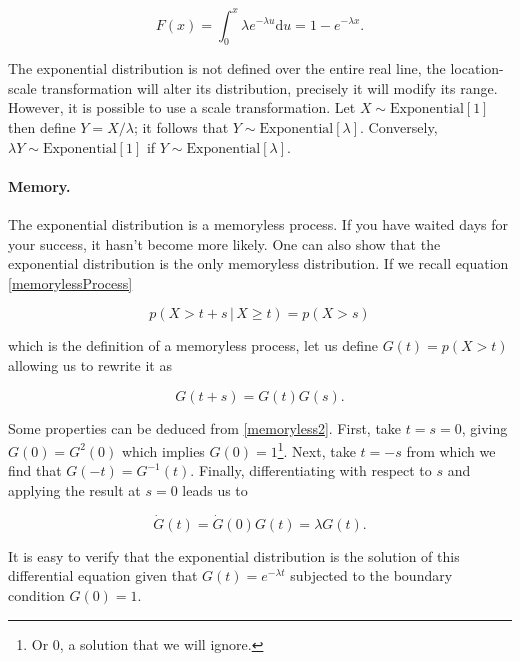 \documentclass[12pt]{article}
\begin{document}
\begin{equation}
F(x) = \int_{0}^{x} \lambda e^{- \lambda u} \mathrm{d} u =
1 - e^{-\lambda x}.
\end{equation}

\noindent
The exponential distribution is not defined over the entire
real line, the location-scale transformation will alter its distribution,
precisely it will modify its range.
However, it is possible to use a scale transformation.
Let $X \sim \text{Exponential} [1] $ then define 
$Y = X / \lambda$; it follows that $Y \sim \text{Exponential} [ \lambda ] $.
Conversely, $\lambda Y \sim \text{Exponential}[1]$ if $ Y \sim \text{Exponential} [ \lambda ]$.

\paragraph{Memory.}
The exponential distribution is a memoryless process.
If you have waited days for your success, it hasn't become more likely.
One can also show that the exponential distribution is the only memoryless
distribution. If we recall equation \eqref{memorylessProcess}

\begin{equation} 
p ( X > t + s \, | \, X \geq t ) = 
p ( X > s )
\end{equation}

\noindent
which is the definition of a memoryless process,
let us define $G(t) = p ( X > t )$ allowing us to rewrite
it as 

\begin{equation} \label{memoryless2}
G(t + s) = G(t) G(s). 
\end{equation}

\noindent
Some properties can be deduced from \eqref{memoryless2}.
First, take $t = s = 0$, giving $G(0) = G^{2}(0)$ which implies $G(0) = 1$\footnote{Or $0$, a solution that we will ignore.}.
Next, take $t = -s$ from which we find that $G(-t) = G^{-1}(t)$. 
Finally, differentiating with respect to $s$ and applying the result at $s = 0$ leads us to

\begin{equation}
\dot{G}(t) = \dot{G}(0) G(t) = \lambda G(t).
\end{equation}

\noindent
It is easy to verify that the exponential distribution is the 
solution of this differential equation given that $G(t) = e^{- \lambda t}$
subjected to the boundary condition $G(0) = 1$.
\end{document}
